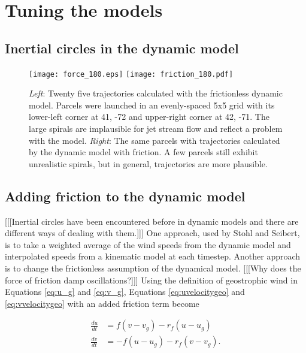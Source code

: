 \chapter{Tuning the models}

\section{Inertial circles in the dynamic model}

\begin{figure}
    \centering
        \texttt{[image: force\_180.eps]}
        \texttt{[image: friction\_180.pdf]}
    \caption{\textit{Left}: Twenty five trajectories calculated with the frictionless dynamic model. 
    Parcels were launched in an evenly-spaced 5x5 grid with its lower-left corner at 41, -72 and upper-right corner at 42, -71. 
    The large spirals are implausible for jet stream flow and reflect a problem with the model. 
    \textit{Right}: The same parcels with trajectories calculated by the dynamic model with friction.
    A few parcels still exhibit unrealistic spirals, but in general, trajectories are more plausible.}
    \label{fig:force_180}
\end{figure}

\section{Adding friction to the dynamic model}

[[[Inertial circles have been encountered before in dynamic models and there are different ways of dealing with them.]]] \cite{stohl_accuracy_1998}
One approach, used by Stohl and Seibert, is to take a weighted average of the wind speeds from the dynamic model and interpolated speeds from a kinematic model at each timestep.
Another approach is to change the frictionless assumption of the dynamical model.
[[[Why does the force of friction damp oscillations?]]]
Using the definition of geostrophic wind in Equations \ref{eq:u_g} and \ref{eq:v_g}, Equations \ref{eq:uvelocitygeo} and \ref{eq:vvelocitygeo} with an added friction term become

\begin{align}
    \frac{du}{dt} &= f (v - v_g) - r_f (u - u_g) \\
    \frac{dv}{dt} &= -f (u - u_g) - r_f (v - v_g).   
\end{align}

